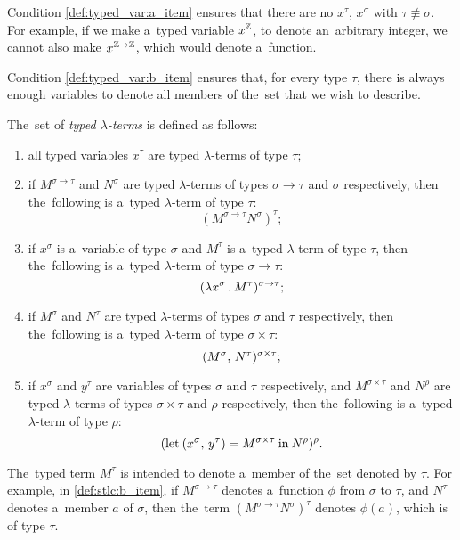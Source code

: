 Condition \ref{def:typed_var:a_item} ensures that there are no $x^\tau$,
$x^\sigma$ with $\tau \not\equiv \sigma$. For example, if we make a~typed
variable $x^\mathbb{Z}$, to denote an~arbitrary integer, we cannot also make
$x^{\mathbb{Z} \to \mathbb{Z}}$, which would denote a~function.

Condition \ref{def:typed_var:b_item} ensures that, for every type $\tau$, there
is always enough variables to denote all members of the~set that we wish to
describe.

\begin{definition}\label{def:stlc}
  The~set of \emph{typed $\lambda$-terms} is defined as follows:
  \begin{enumerate}
    \item all typed variables $x^\tau$ are typed $\lambda$-terms of type $\tau$;
    \item \label{def:stlc:b_item} if $M^{\sigma \to \tau}$ and $N^\sigma$ are
      typed $\lambda$-terms of types $\sigma \to \tau$ and $\sigma$
      respectively, then the~following is a~typed $\lambda$-term of type $\tau$:
      \[
        (M^{\sigma \to \tau} N^\sigma)^\tau;
      \]
    \item if $x^\sigma$ is a~variable of type $\sigma$ and $M^\tau$ is a~typed
      $\lambda$-term of type $\tau$, then the~following is a~typed
      $\lambda$-term of type $\sigma \to \tau$:
      \[
        (\lambda x^\sigma \, . \: M^\tau)^{\sigma \to \tau};
      \]
    \item \label{def:stlc:d_item} if $M^\sigma$ and $N^\tau$ are typed
      $\lambda$-terms of types $\sigma$ and $\tau$ respectively, then
      the~following is a~typed $\lambda$-term of type $\sigma \times \tau$:
      \[
        (M^\sigma, \, N^\tau) ^{\sigma \times \tau};
      \]
    \setcounter{stlc_counter}{\value{enumi}}
    \item \label{def:stlc:e_item} if $x^\sigma$ and $y^\tau$ are variables of
      types $\sigma$ and $\tau$ respectively, and $M^{\sigma \times \tau}$ and
      $N^\rho$ are typed $\lambda$-terms of types $\sigma \times \tau$ and
      $\rho$ respectively, then the~following is a~typed $\lambda$-term of type
      $\rho$:
      \[
        (\textrm{let} \: (x^\sigma, \, y^\tau) = M^{\sigma \times \tau} \:
        \textrm{in} \: N^{\rho})^\rho.
      \]
\end{enumerate}
\end{definition}

The~typed term $M^\tau$ is intended to denote a~member of the~set denoted by
$\tau$. For example, in \ref{def:stlc:b_item}, if $M^{\sigma \to \tau}$ denotes
a~function $\phi$ from $\sigma$ to $\tau$, and $N^\tau$ denotes a~member $a$ of
$\sigma$, then the~term $(M^{\sigma \to \tau} N^\sigma)^\tau$ denotes $\phi(a)$,
which is of type $\tau$.

